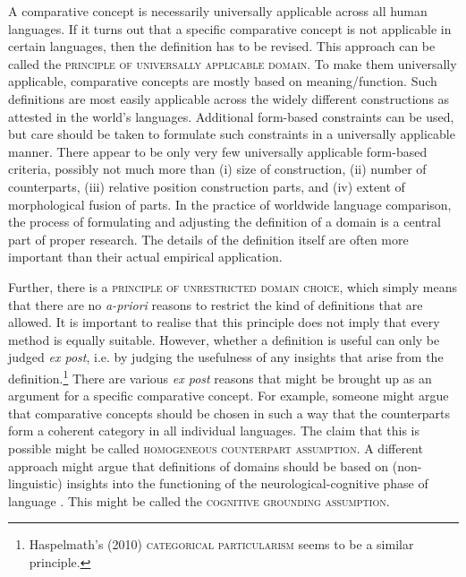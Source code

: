 %
A comparative concept is necessarily universally applicable across all human languages. If it turns out that a specific comparative concept is not applicable in certain languages, then the definition has to be revised. This approach can be called the \textsc{principle of universally applicable domain}. To make them universally applicable, comparative concepts are mostly based on meaning/function. Such definitions are most easily applicable across the widely different constructions as attested in the world's languages. Additional form-based constraints can be used, but care should be taken to formulate such constraints in a universally applicable manner. There appear to be only very few universally applicable form-based criteria, possibly not much more than (i) size of construction, (ii) number of counterparts, (iii) relative position construction parts, and (iv) extent of morphological fusion of parts. In the practice of worldwide language comparison, the process of formulating and adjusting the definition of a domain is a central part of proper research. The details of the definition itself are often more important than their actual empirical application.

Further, there is a \textsc{principle of unrestricted domain choice}, which simply means that there are no \textit{a-priori} reasons to restrict the kind of definitions that are allowed. It is important to realise that this principle does not imply that every method is equally suitable. However, whether a definition is useful can only be judged \textit{ex post}, i.e. by judging the usefulness of any insights that arise from the definition.\footnote{Haspelmath's (2010) \textsc{categorical particularism} seems to be a similar principle.} There are various \textit{ex post} reasons that might be brought up as an argument for a specific comparative concept. For example, someone might argue that comparative concepts should be chosen in such a way that the counterparts form a coherent category in all individual languages. The claim that this is possible might be called \textsc{homogeneous counterpart assumption}. A different approach might argue that definitions of domains should be based on (non-linguistic) insights into the functioning of the neurological-cognitive phase of language . This might be called the \textsc{cognitive grounding assumption}. 


